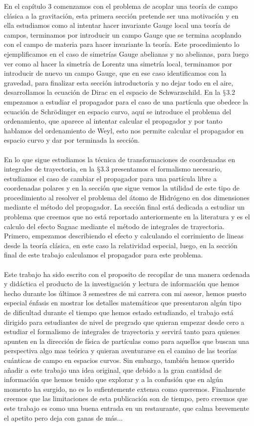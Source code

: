 En el capítulo 3 comenzamos con el problema de acoplar una teoría de campo clásica a la gravitación, esta primera sección pretende ser una motivación y en ella estudiamos como al intentar hacer invariante Gauge local una teoría de campos, terminamos por introducir un campo Gauge que se termina acoplando con el campo de materia para hacer invariante la teoría. Este procedimiento lo ejemplificamos en el caso de simetrías Gauge abelianas y no abelianas, para luego ver como al hacer la simetría de Lorentz una simetría local, terminamos por introducir de nuevo un campo Gauge, que en ese caso identificamos con la gravedad, para finalizar esta sección introductoria y no dejar todo en el aire, desarrollamos la ecuación de Dirac en el espacio de Schwarzschild. En la  $\mathsection$3.2 empezamos a estudiar el propagador para el caso de una partícula que obedece la ecuación de Schrödinger en espacio curvo, aquí se introduce el problema del ordenamiento, que aparece al intentar calcular el propagador y por tanto hablamos del ordenamiento de Weyl, esto nos permite calcular el propagador en espacio curvo y dar por terminada la sección.
\\
\\
En lo que sigue estudiamos la técnica de transformaciones de coordenadas en integrales de trayectoria, en la  $\mathsection$3.3 presentamos el formalismo necesario, estudiamos el caso de cambiar el propagador para una partícula libre a coordenadas polares y en la sección que sigue vemos la utilidad de este tipo de procedimiento al resolver el problema del átomo de Hidrógeno en dos dimensiones mediante el método del propagador. La sección final está dedicada a estudiar un problema que creemos que no está reportado anteriormente en la literatura y es el calculo del efecto Sagnac mediante el método de integrales de trayectoria. Primero, empezamos describiendo el efecto y calculando el corrimiento de lineas desde la teoría clásica, en este caso la relatividad especial, luego, en la sección final de este trabajo calculamos el propagador para este problema.
\\
\\
Este trabajo ha sido escrito con el proposito de recopilar de una manera ordenada y didáctica el producto de la investigación y lectura de información que hemos hecho durante los últimos 3 semestres de mi carrera con mi asesor, hemos puesto especial énfasis en mostrar los detalles matemáticos que presentaron algún tipo de dificultad durante el tiempo que hemos estado estudiando, el trabajo está dirigido para estudiantes de nivel de pregrado que quieran empezar desde cero a estudiar el formalismo de integrales de trayectoria y servirá tanto para quienes apunten en la dirección de física de partículas como para aquellos que buscan una perspectiva algo mas teórica y quieran aventurarse en el camino de las teorías cuánticas de campo en espacios curvos. Sin embargo, también hemos querido añadir a este trabajo una idea original, que debido a la gran cantidad de información que hemos tenido que explorar y a la confusión que en algún momento ha surgido, no es lo sufientemente extensa como queremos. Finalmente creemos que las limitaciones de esta publicación son de tiempo, pero creemos que este trabajo es como una buena entrada en un restaurante, que calma brevemente el apetito pero deja con ganas de más...